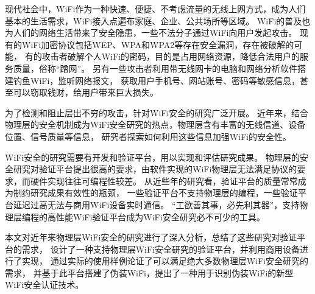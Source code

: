 
\begin{cabstract}

	现代社会中，WiFi作为一种快速、便捷、不考虑流量的无线上网方式，成为人们基本的生活需求，WiFi接入点遍布家庭、企业、公共场所等区域。
	WiFi的普及也为人们的网络生活带来了安全隐患，一些不法分子通过WiFi向用户发起攻击。
	现有的WiFi加密协议包括WEP、WPA和WPA2等存在安全漏洞，存在被破解的可能，
	有的攻击者破解个人WiFi的密码，目的是占用网络资源，降低合法用户的服务质量，俗称“蹭网”。
	另有一些攻击者利用带无线网卡的电脑和网络分析软件搭建钓鱼WiFi，监听网络报文，
	获取用户手机号、网站账号、密码等敏感信息，甚至可以窃取钱财，给用户带来巨大损失。

	为了检测和阻止层出不穷的攻击，针对WiFi安全的研究广泛开展。
	近年来，结合物理层的安全机制成为WiFi安全研究的热点，物理层含有丰富的无线信道、设备位置、信号质量等信息，
	研究者探索如何利用这些信息加强WiFi的安全性。

	WiFi安全的研究需要有开发和验证平台，用以实现和评估研究成果。
	物理层的安全研究对验证平台提出很高的要求，由软件实现的WiFi物理层无法满足协议的要求，而硬件实现往往可编程性较差。
	从近些年的研究看，验证平台的质量常常成为制约研究成果有效性的瓶颈，
	一些验证平台不支持物理层的编程，一些验证平台延迟过高无法与商用WiFi设备实时通信。
	“工欲善其事，必先利其器”，支持物理层编程的高性能WiFi验证平台成为WiFi安全研究必不可少的工具。

	本文对近年来物理层WiFi安全的研究进行了深入分析，总结了这些研究对验证平台的需求，
	设计了一种支持物理层WiFi安全研究的验证平台，并利用商用设备进行了实现，
	通过实际的使用样例论证了可以满足绝大多数物理层WiFi安全研究的需求，
	并基于此平台搭建了伪装WiFi，提出了一种用于识别伪装WiFi的新型WiFi安全认证技术。

\end{cabstract}

